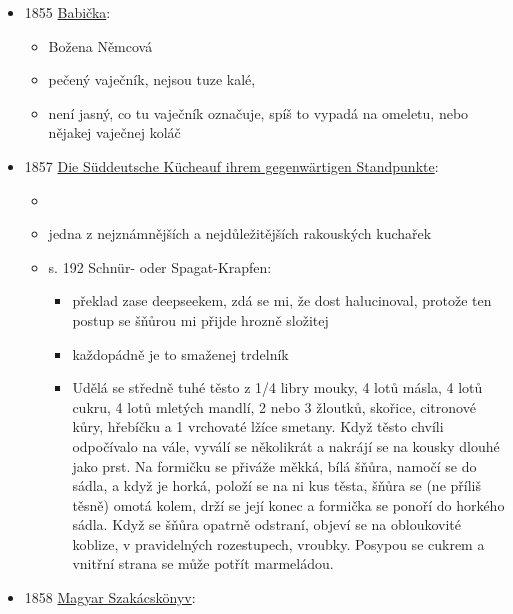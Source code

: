 \begin{itemize}
  \begin{itemize}
  \tightlist
  \item
    s. 462
  \item
    Josef Franta Šumavský, Josef Rank
  \item
    Spies-krapfen, -kuchen = vaječník, trdelník
  \item
    existuje spousta dalších vydání, třeba z roku 1846, kde je to samý
    heslo
  \end{itemize}
\item
  1855
  \href{https://ceskadigitalniknihovna.cz/uuid/uuid:2f58bcf0-f6ae-11dd-8224-000d606f5dc6}{Babička}:

  \begin{itemize}
  \tightlist
  \item
    Božena Němcová
  \item
    pečený vaječník, nejsou tuze kalé,
  \item
    není jasný, co tu vaječník označuje, spíš to vypadá na omeletu, nebo
    nějakej vaječnej koláč
  \end{itemize}
\item
  1857
  \href{https://austria-forum.org/web-books/diesuddeutschek00de1858kfu}{Die
  Süddeutsche Kücheauf ihrem gegenwärtigen Standpunkte}:

  \begin{itemize}
  \tightlist
  \item
  \item
    jedna z nejznámnějších a nejdůležitějších rakouských kuchařek
  \item
    s. 192  Schnür- oder Spagat-Krapfen:

    \begin{itemize}
    \tightlist
    \item
      překlad zase deepseekem, zdá se mi, že dost halucinoval, protože
      ten postup se šňůrou mi přijde hrozně složitej
    \item
      každopádně je to smaženej trdelník
    \item
      Udělá se středně tuhé těsto z 1/4 libry mouky, 4 lotů másla, 4
      lotů cukru, 4 lotů mletých mandlí, 2 nebo 3 žloutků, skořice,
      citronové kůry, hřebíčku a 1 vrchovaté lžíce smetany. Když těsto
      chvíli odpočívalo na vále, vyválí se několikrát a nakrájí se na
      kousky dlouhé jako prst. Na formičku se přiváže měkká, bílá šňůra,
      namočí se do sádla, a když je horká, položí se na ni kus těsta,
      šňůra se (ne příliš těsně) omotá kolem, drží se její konec a
      formička se ponoří do horkého sádla. Když se šňůra opatrně
      odstraní, objeví se na obloukovité koblize, v pravidelných
      rozestupech, vroubky. Posypou se cukrem a vnitřní strana se může
      potřít marmeládou.
    \end{itemize}
  \end{itemize}
\item
  1858
  \href{https://web.archive.org/web/20201229075651/http://www.kurtos.eu/dl/nzs.pdf}{Magyar
  Szakácskönyv}:


\end{itemize}

